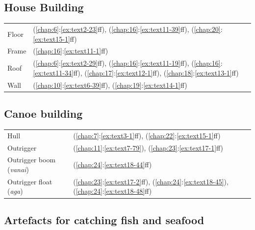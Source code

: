 \subsection{House Building}

\begin{tabularx}{\textwidth}{p{5cm}X}
    Floor&(\ref{chap:6}:\ref{ex:text2-23}ff), (\ref{chap:16}:\ref{ex:text11-39}ff), (\ref{chap:20}:\ref{ex:text15-1}ff)\\
    Frame&(\ref{chap:16}:\ref{ex:text11-1}ff)\\
    Roof&(\ref{chap:6}:\ref{ex:text2-29}ff), (\ref{chap:16}:\ref{ex:text11-19}ff), (\ref{chap:16}:\ref{ex:text11-34}ff), (\ref{chap:17}:\ref{ex:text12-1}ff), (\ref{chap:18}:\ref{ex:text13-1}ff)\\
    Wall&(\ref{chap:10}:\ref{ex:text6-39}ff), (\ref{chap:19}:\ref{ex:text14-1}ff)\\
\end{tabularx}

\subsection{Canoe building}

\begin{tabularx}{\textwidth}{p{5cm}X}
    Hull&(\ref{chap:7}:\ref{ex:text3-1}ff), (\ref{chap:22}:\ref{ex:text15-1}ff)\\
    Outrigger&(\ref{chap:11}:\ref{ex:text7-79}), (\ref{chap:23}:\ref{ex:text17-1}ff)\\
    Outrigger boom (\textit{vanai})&(\ref{chap:24}:\ref{ex:text18-44}ff)\\
    Outrigger float (\textit{aga})&(\ref{chap:23}:\ref{ex:text17-2}ff), (\ref{chap:24}:\ref{ex:text18-45}), (\ref{chap:24}:\ref{ex:text18-48}ff)\\
\end{tabularx}

\subsection{Artefacts for catching fish and seafood}

